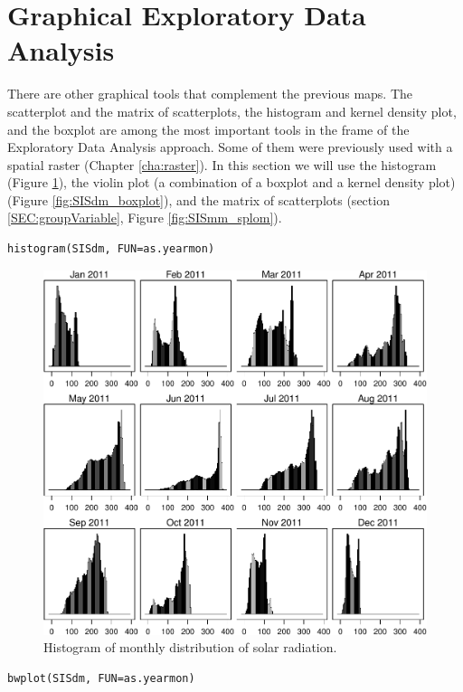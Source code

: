\documentclass[smallroyalvopaper]{memoir}
\begin{document}
\section{Graphical Exploratory Data Analysis}
\label{sec-3}

There are other graphical tools that complement the previous maps. The
scatterplot and the matrix of scatterplots, the histogram and kernel
density plot, and the boxplot are among the most important tools in
the frame of the Exploratory Data Analysis approach. Some of them were
previously used with a spatial raster (Chapter \ref{cha:raster}). In
this section we will use the histogram (Figure \ref{fig:SISdm_hist}),
the violin plot (a combination of a boxplot and a kernel density plot)
(Figure \ref{fig:SISdm_boxplot}), and the matrix of scatterplots
(section \ref{SEC:groupVariable}, Figure \ref{fig:SISmm_splom}).


\lstset{language=R,numbers=none}
\begin{lstlisting}
histogram(SISdm, FUN=as.yearmon)
\end{lstlisting}

\begin{figure}[htb]
\centering
\includegraphics[width=.9\linewidth]{figs/SISdm_histogram.pdf}
\caption{\label{fig:SISdm_hist}Histogram of monthly distribution of solar radiation.}
\end{figure}


\lstset{language=R,numbers=none}
\begin{lstlisting}
bwplot(SISdm, FUN=as.yearmon)
\end{lstlisting}
\end{document}
